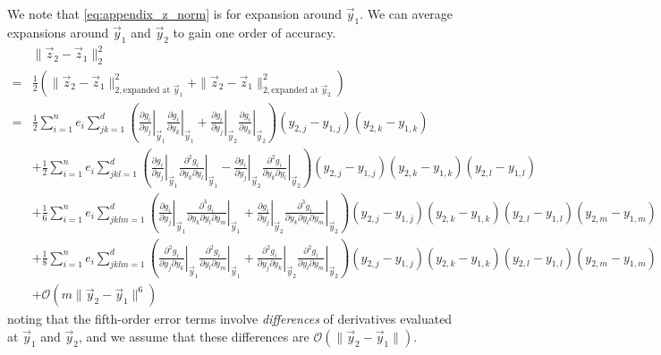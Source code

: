 \documentclass[12pt]{article}
\begin{document}
We note that \eqref{eq:appendix_z_norm} is for expansion around $\vec{y}_1$. 
%
We can average expansions around $\vec{y}_1$ and $\vec{y}_2$ to gain one order of accuracy. 
%
\begin{equation} 
\begin{aligned}
& \|\vec{z}_2 - \vec{z}_1\|_2^2 \\
=& \frac{1}{2} \left( \|\vec{z}_2 - \vec{z}_1\|_{2, \text{expanded at } \vec{y}_1}^2  + \|\vec{z}_2 - \vec{z}_1\|_{2, \text{expanded at } \vec{y}_2}^2 \right) \\
=& \frac{1}{2} \sum_{i=1}^n e_i \sum_{jk=1}^d \left( \left. \frac{\partial g_i}{\partial y_j} \right|_{\vec{y}_1} \left. \frac{\partial g_i}{\partial y_k} \right|_{\vec{y}_1} + \left. \frac{\partial g_i}{\partial y_j} \right|_{\vec{y}_2} \left. \frac{\partial g_i}{\partial y_k} \right|_{\vec{y}_2} \right) (y_{2,j}-y_{1,j}) (y_{2,k}-y_{1,k}) \\
&+ \frac{1}{2} \sum_{i=1}^n e_i \sum_{jkl=1}^d \left( \left. \frac{\partial g_i}{\partial y_j} \right|_{\vec{y}_1} \left. \frac{\partial^2 g_i}{\partial y_k \partial y_l} \right|_{\vec{y}_1} - \left. \frac{\partial g_i}{\partial y_j} \right|_{\vec{y}_2} \left. \frac{\partial^2 g_i}{\partial y_k \partial y_l} \right|_{\vec{y}_2} \right) (y_{2,j}-y_{1,j})  (y_{2,k}-y_{1,k}) (y_{2,l}-y_{1,l}) \\
&+ \frac{1}{6} \sum_{i=1}^n e_i \sum_{jklm=1}^d \left( \left. \frac{\partial g_i}{\partial y_j} \right|_{\vec{y}_1} \left. \frac{\partial^3 g_i}{ \partial y_k \partial y_l \partial y_m} \right|_{\vec{y}_1} + \left. \frac{\partial g_i}{\partial y_j} \right|_{\vec{y}_2} \left. \frac{\partial^3 g_i}{ \partial y_k \partial y_l \partial y_m} \right|_{\vec{y}_2} \right) (y_{2,j}-y_{1,j}) (y_{2,k}-y_{1,k}) (y_{2,l}-y_{1,l})(y_{2,m}-y_{1,m}) \\
&+ \frac{1}{8} \sum_{i=1}^n e_i \sum_{jklm=1}^d \left( \left. \frac{\partial^2 g_i}{\partial y_j \partial y_k} \right|_{\vec{y}_1} \left. \frac{\partial^2 g_i}{\partial y_l \partial y_m} \right|_{\vec{y}_1} + \left. \frac{\partial^2 g_i}{\partial y_j \partial y_k} \right|_{\vec{y}_2} \left. \frac{\partial^2 g_i}{\partial y_l \partial y_m} \right|_{\vec{y}_2} \right) (y_{2,j}-y_{1,j}) (y_{2,k}-y_{1,k}) (y_{2,l}-y_{1,l}) (y_{2,m}-y_{1,m}) \\
&+ \mathcal{O}(m \|\vec{y}_2 - \vec{y}_1 \|^6)
\end{aligned}
\end{equation}
%
noting that the fifth-order error terms involve {\em differences} of derivatives evaluated at $\vec{y}_1$ and $\vec{y}_2$, and we assume that these differences are $\mathcal{O} (\| \vec{y}_2 - \vec{y}_1 \|)$. 
\end{document}

